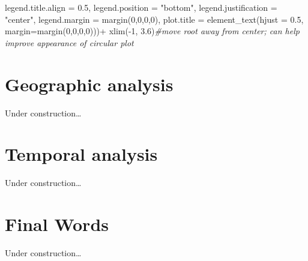 \documentclass[
]{book}
\newenvironment{Shaded}{\begin{snugshade}}{\end{snugshade}}
\newcommand{\AttributeTok}[1]{\textcolor[rgb]{0.77,0.63,0.00}{#1}}
\newcommand{\CommentTok}[1]{\textcolor[rgb]{0.56,0.35,0.01}{\textit{#1}}}
\newcommand{\DecValTok}[1]{\textcolor[rgb]{0.00,0.00,0.81}{#1}}
\newcommand{\FloatTok}[1]{\textcolor[rgb]{0.00,0.00,0.81}{#1}}
\newcommand{\FunctionTok}[1]{\textcolor[rgb]{0.00,0.00,0.00}{#1}}
\newcommand{\NormalTok}[1]{#1}
\newcommand{\SpecialCharTok}[1]{\textcolor[rgb]{0.00,0.00,0.00}{#1}}
\newcommand{\StringTok}[1]{\textcolor[rgb]{0.31,0.60,0.02}{#1}}
\begin{document}
\begin{Shaded}
\begin{Highlighting}[]
        \AttributeTok{legend.title.align =} \FloatTok{0.5}\NormalTok{,}
        \AttributeTok{legend.position =} \StringTok{"bottom"}\NormalTok{,}
        \AttributeTok{legend.justification =} \StringTok{"center"}\NormalTok{,}
        \AttributeTok{legend.margin =} \FunctionTok{margin}\NormalTok{(}\DecValTok{0}\NormalTok{,}\DecValTok{0}\NormalTok{,}\DecValTok{0}\NormalTok{,}\DecValTok{0}\NormalTok{),}
        \AttributeTok{plot.title =} \FunctionTok{element\_text}\NormalTok{(}\AttributeTok{hjust =} \FloatTok{0.5}\NormalTok{, }\AttributeTok{margin=}\FunctionTok{margin}\NormalTok{(}\DecValTok{0}\NormalTok{,}\DecValTok{0}\NormalTok{,}\DecValTok{0}\NormalTok{,}\DecValTok{0}\NormalTok{)))}\SpecialCharTok{+}
  \FunctionTok{xlim}\NormalTok{(}\SpecialCharTok{{-}}\DecValTok{1}\NormalTok{, }\FloatTok{3.6}\NormalTok{)}\CommentTok{\#move root away from center; can help improve appearance of circular plot}
\end{Highlighting}
\end{Shaded}

\hypertarget{geo}{%
\chapter{Geographic analysis}\label{geo}}

Under construction\ldots{}

\hypertarget{tem}{%
\chapter{Temporal analysis}\label{tem}}

Under construction\ldots{}

\hypertarget{conc}{%
\chapter{Final Words}\label{conc}}

Under construction\ldots{}

  
\end{document}
